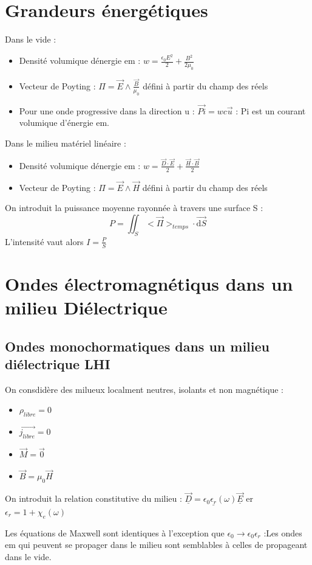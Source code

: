 \documentclass[french]{yLectureNote}
\renewcommand{\vec}{\overrightarrow}
\newcommand{\dd}{\mathrm{d}}
\begin{document}
\section{Grandeurs énergétiques}
Dans le vide :
\begin{itemize}
    \item Densité volumique dénergie em : $w = \frac{\epsilon_0 E^2}{2}+ \frac{B^2}{2\mu_0}$
    \item Vecteur de Poyting : $\Pi = \vec{E}\wedge \frac{\vec{B}}{\mu_0}$ défini à partir du champ des réels 
    \item Pour une onde progressive dans la direction u : $\vec{Pi} = wc\vec{u}$ : Pi est un courant volumique d'énergie em.
\end{itemize}

Dans le milieu matériel linéaire :
\begin{itemize}
    \item Densité volumique dénergie em : $w = \frac{\vec{D}\cdot \vec{E}}{2}+\frac{\vec{H}\cdot \vec{B}}{2}$
    \item Vecteur de Poyting : $\Pi = \vec{E}\wedge \vec{H}$ défini à partir du champ des réels 
\end{itemize}
On introduit la puissance moyenne rayonnée à travers une surface S :
$$P = \iint_S <\vec{\Pi}>_{temps}\cdot \vec{\dd S}$$
L'intensité vaut alors $ I = \frac{P}{S}$
\section{Ondes électromagnétiqus dans un milieu Diélectrique}
\subsection{Ondes monochormatiques dans un milieu diélectrique LHI}
On consdidère des milueux localment neutres, isolants et non magnétique :
\begin{itemize}
    \item $\rho_{libre} =0$
    \item $\vec{j_{libre}} = 0$
    \item $\vec{M} = \vec{0}$
    \item $\vec{B} = \mu_0\vec{H}$
\end{itemize}
On introduit la relation constitutive du milieu : $\vec{\underline{D}} = \epsilon_0\underline{\epsilon_r}(\omega)\vec{\underline{E}}$ er $\epsilon_r = 1+ \chi_e(\omega)$

Les équations de Maxwell sont identiques à l'exception que $\epsilon_0\to \epsilon_0\epsilon_r$ :Les ondes em qui peuvent se propager dans le milieu sont semblables à celles de propageant dans le vide.
\end{document}
